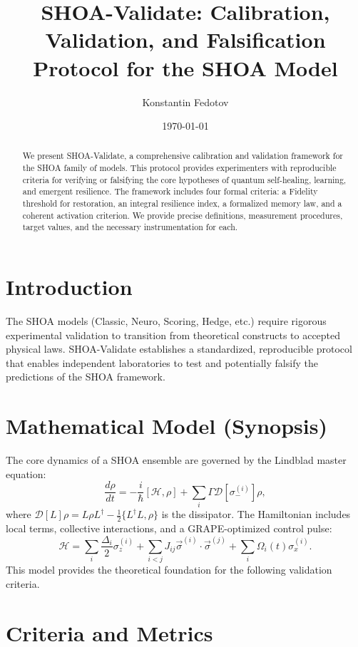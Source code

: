\documentclass[12pt]{article}
\title{SHOA-Validate: Calibration, Validation, and Falsification Protocol for the SHOA Model}
\author{Konstantin Fedotov}
\date{\today}
\begin{document}
\maketitle

\begin{abstract}
We present SHOA-Validate, a comprehensive calibration and validation framework for the SHOA family of models. This protocol provides experimenters with reproducible criteria for verifying or falsifying the core hypotheses of quantum self-healing, learning, and emergent resilience. The framework includes four formal criteria: a Fidelity threshold for restoration, an integral resilience index, a formalized memory law, and a coherent activation criterion. We provide precise definitions, measurement procedures, target values, and the necessary instrumentation for each.
\end{abstract}

\section{Introduction}
The SHOA models (Classic, Neuro, Scoring, Hedge, etc.) require rigorous experimental validation to transition from theoretical constructs to accepted physical laws. SHOA-Validate establishes a standardized, reproducible protocol that enables independent laboratories to test and potentially falsify the predictions of the SHOA framework.

\section{Mathematical Model (Synopsis)}
The core dynamics of a SHOA ensemble are governed by the Lindblad master equation:
\begin{equation}
\frac{d\rho}{dt} = -\frac{i}{\hbar} [\mathcal{H}, \rho] + \sum_i \Gamma \mathcal{D}[\sigma_-^{(i)}]\rho,
\end{equation}
where $\mathcal{D}[L]\rho = L \rho L^\dagger - \frac{1}{2} \{ L^\dagger L, \rho \}$ is the dissipator. The Hamiltonian includes local terms, collective interactions, and a GRAPE-optimized control pulse:
\begin{equation}
\mathcal{H} = \sum_i \frac{\Delta_i}{2} \sigma_z^{(i)} + \sum_{i<j} J_{ij} \vec{\sigma}^{(i)} \cdot \vec{\sigma}^{(j)} + \sum_i \Omega_i(t) \sigma_x^{(i)}.
\end{equation}
This model provides the theoretical foundation for the following validation criteria.

\section{Criteria and Metrics}
\end{document}

